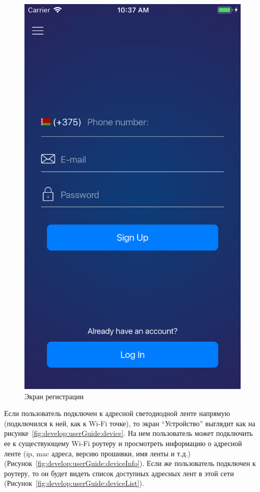 \begin{figure}[H]
\centering
	\includegraphics[scale=0.25]{figures/userGuide/signUp.png}
	\caption{Экран регистрации}
	\label{fig:develop:userGuide:signUp}
\end{figure}
\vspace*{-1pt}
Если пользователь подключен к адресной светодиодной ленте напрямую (подключился к ней, как к Wi-Fi точке), то экран \enquote{Устройство} выглядит как на рисунке~\ref{fig:develop:userGuide:device}. На нем пользователь может подключить ее к существующему Wi-Fi роутеру и просмотреть информацию о адресной ленте (ip, mac адреса, версию прошивки, имя ленты и т.д.) (Рисунок~\ref{fig:develop:userGuide:deviceInfo}). Если же пользователь подключен к роутеру, то он будет видеть список доступных адресных лент в этой сети (Рисунок~\ref{fig:develop:userGuide:deviceList}).

